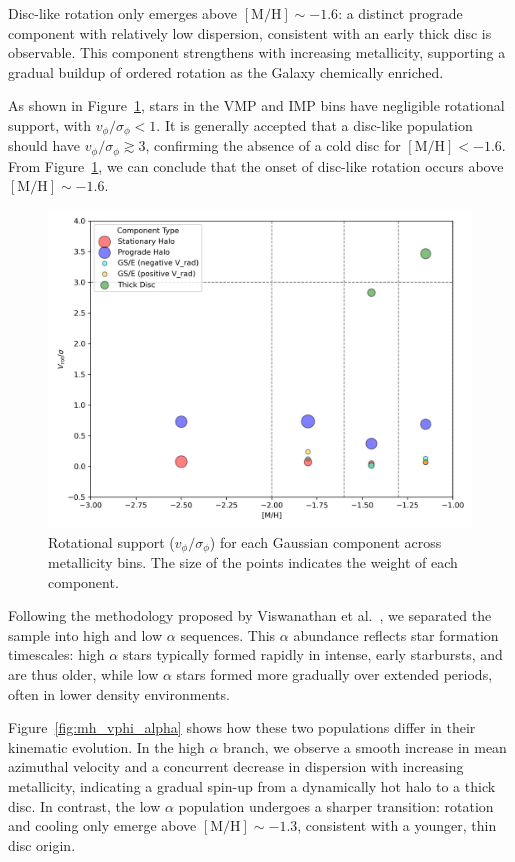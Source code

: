 \documentclass[a4paper,10pt]{article}
\begin{document}
\begin{multicols}{2}
Disc-like rotation only emerges above $\mathrm{[M/H]} \sim -1.6$: a distinct prograde component with 
relatively low dispersion, consistent with an early thick disc is observable. 
This component strengthens with increasing metallicity, supporting a gradual buildup of 
ordered rotation as the Galaxy chemically enriched.

As shown in Figure~\ref{fig:v_over_sigma}, stars in the VMP and IMP bins have negligible rotational support, 
with $v_\phi / \sigma_\phi < 1$. It is generally accepted that a disc-like population should have 
$v_\phi / \sigma_\phi \gtrsim 3$, confirming the absence of a cold disc for $\mathrm{[M/H]} < -1.6$.
From Figure~\ref{fig:v_over_sigma}, we can conclude that the onset of disc-like rotation occurs 
above $\mathrm{[M/H]} \sim -1.6$.

\begin{figure}[H]
  \centering
  \includegraphics[width=0.7\linewidth]{../figures/v_over_sigma_per_component.png}
  \caption{Rotational support ($v_\phi / \sigma_\phi$) for each Gaussian component across metallicity bins.
  The size of the points indicates the weight of each component.}
  \label{fig:v_over_sigma}
\end{figure}


Following the methodology proposed by Viswanathan et al.~\cite{Vis2024}, we separated the sample into 
high and low $\alpha$ sequences. This $\alpha$ abundance reflects star formation timescales: high $\alpha$ 
stars typically formed rapidly in intense, early starbursts, and are thus older, while low $\alpha$ stars 
formed more gradually over extended periods, often in lower density environments.

Figure~\ref{fig:mh_vphi_alpha} shows how these two populations differ in their kinematic evolution. 
In the high $\alpha$ branch, we observe a smooth increase in mean azimuthal velocity and a concurrent 
decrease in dispersion with increasing metallicity, indicating a gradual spin-up from a dynamically hot 
halo to a thick disc. In contrast, the low $\alpha$ population undergoes a sharper transition: 
rotation and cooling only emerge above $\mathrm{[M/H]} \sim -1.3$, consistent with a younger, thin disc origin.


\end{multicols}
\end{document}
